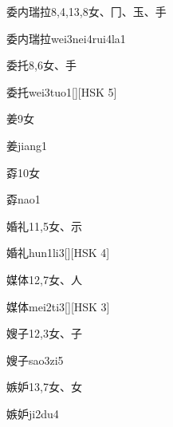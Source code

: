 \begin{entry}{委内瑞拉}{8,4,13,8}{⼥、⼌、⽟、⼿}
  \begin{phonetics}{委内瑞拉}{wei3nei4rui4la1}
  \end{phonetics}
\end{entry}

\begin{entry}{委托}{8,6}{⼥、⼿}
  \begin{phonetics}{委托}{wei3tuo1}[][HSK 5]
  \end{phonetics}
\end{entry}

\begin{entry}{姜}{9}{⼥}
  \begin{phonetics}{姜}{jiang1}
  \end{phonetics}
\end{entry}

\begin{entry}{孬}{10}{⼥}
  \begin{phonetics}{孬}{nao1}
  \end{phonetics}
\end{entry}

\begin{entry}{婚礼}{11,5}{⼥、⽰}
  \begin{phonetics}{婚礼}{hun1li3}[][HSK 4]
  \end{phonetics}
\end{entry}

\begin{entry}{媒体}{12,7}{⼥、⼈}
  \begin{phonetics}{媒体}{mei2ti3}[][HSK 3]
  \end{phonetics}
\end{entry}

\begin{entry}{嫂子}{12,3}{⼥、⼦}
  \begin{phonetics}{嫂子}{sao3zi5}
  \end{phonetics}
\end{entry}

\begin{entry}{嫉妒}{13,7}{⼥、⼥}
  \begin{phonetics}{嫉妒}{ji2du4}
  \end{phonetics}
\end{entry}


